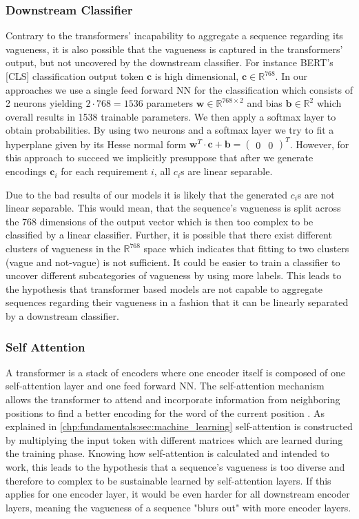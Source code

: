 \subsubsection{Downstream Classifier}
\label{chp:study:sec:interpretation:subsec:causes:downstream_classifier}
Contrary to the transformers' incapability to aggregate a sequence regarding its vagueness, it is also possible that the vagueness is captured in the transformers' output, but not uncovered by the downstream classifier.
For instance \ac{BERT}'s [CLS] classification output token $\bm{c}$ is high dimensional, $\bm{c} \in \mathbb{R}^{768}$.
In our approaches we use a single feed forward \ac{NN} for the classification which consists of 2 neurons yielding $2 \cdot 768 = 1536$ parameters $\bm{w} \in \mathbb{R}^{768 \times 2}$ and bias $\bm{b} \in \mathbb{R}^2$ which overall results in 1538 trainable parameters.
We then apply a softmax layer to obtain probabilities.
By using two neurons and a softmax layer we try to fit a hyperplane given by its Hesse normal form $ \bm{w}^T \cdot \bm{c} + \bm{b} = \begin{pmatrix} 0 & 0 \end{pmatrix}^T$.
However, for this approach to succeed we implicitly presuppose that after we generate encodings $\bm{c}_i$ for each requirement $i$, all $c_i$s are linear separable.

Due to the bad results of our models it is likely that the generated $c_i$s are not linear separable.
This would mean, that the sequence's vagueness is split across the 768 dimensions of the output vector which is then too complex to be classified by a linear classifier.
Further, it is possible that there exist different clusters of vagueness in the $\mathbb{R}^{768}$ space which indicates that fitting to two clusters (vague and not-vague) is not sufficient.
It could be easier to train a classifier to uncover different subcategories of vagueness by using more labels.
This leads to the hypothesis that transformer based models are not capable to aggregate sequences regarding their vagueness in a fashion that it can be linearly separated by a downstream classifier.

\subsubsection{Self Attention}
\label{chp:study:sec:interpretation:subsec:causes:self_attention}
A transformer is a stack of encoders where one encoder itself is composed of one self-attention layer and one feed forward \ac{NN}.
The self-attention mechanism allows the transformer to attend and incorporate information from neighboring positions to find a better encoding for the word of the current position \parencite{Vaswani:2017}.
As explained in \cref{chp:fundamentals:sec:machine_learning} self-attention is constructed by multiplying the input token with different matrices which are learned during the training phase.
Knowing how self-attention is calculated and intended to work, this leads to the hypothesis that a sequence's vagueness is too diverse and therefore to complex to be sustainable learned by self-attention layers.
If this applies for one encoder layer, it would be even harder for all downstream encoder layers, meaning the vagueness of a sequence "blurs out" with more encoder layers.
